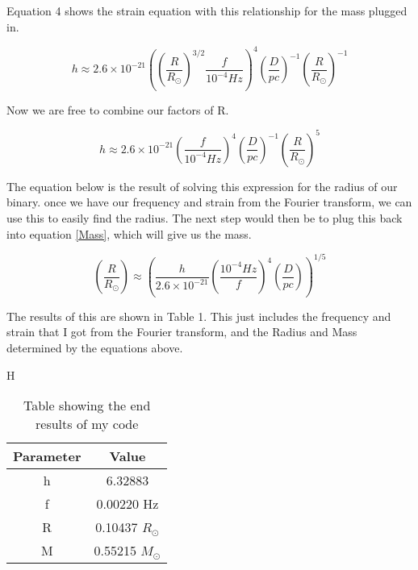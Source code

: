 \documentclass{article}
\begin{document}
Equation 4 shows the strain equation with this relationship for the mass plugged in.

\begin{equation}\label{nh}
h \approx 2.6 \times 10^{-21}  ( (\frac{R}{R_\odot})^{3/2} \frac{f}{10^{-4} Hz})^4 (\frac{D}{pc}) ^{-1}(\frac{R}{R_\odot})^{-1}
\end{equation}

Now we are free to combine our factors of R.

\begin{equation}\label{nh}
h \approx 2.6 \times 10^{-21}  ( \frac{f}{10^{-4} Hz})^4 (\frac{D}{pc}) ^{-1}(\frac{R}{R_\odot})^{5}
\end{equation}

The equation below is the result of solving this expression for the radius of our binary. once we have our frequency and strain from the Fourier transform, we can use this to easily find the radius. The next step would then be to plug this back into equation \ref{Mass}, which will give us the mass.

\begin{equation}\label{Radius}
   (\frac{R}{R_\odot}) \approx (\frac{h}{2.6 \times 10^{-21} }   ( \frac{10^{-4}Hz}{f})^4 (\frac{D}{pc}))^{1/5}
\end{equation}

The results of this are shown in Table 1. This just includes the frequency and strain that I got from the Fourier transform, and the Radius and Mass determined by the equations above.\\


\begin{table}{H}\label{T1}
\caption{Table showing the end results of my code}
\begin{center}
\begin{tabular}{| c | c |}
\hline
Parameter & Value \\
\hline
h & 6.32883\\ 
\hline
f & 0.00220 Hz\\
\hline
R & 0.10437 $R_\odot$\\
\hline
M & 0.55215 $M_\odot$\\
\hline
\end{tabular}
\end{center}
\end{table}
\end{document}
